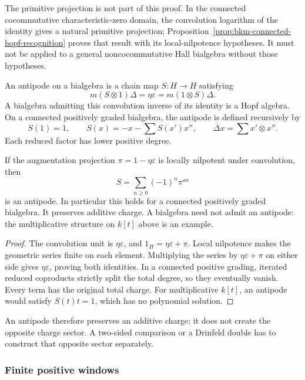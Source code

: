 The primitive projection is not part of this proof. In the
connected cocommutative characteristic-zero domain, the
convolution logarithm of the identity gives a natural primitive
projection; Proposition~\ref{prop:bkm-connected-hopf-recognition}
proves that result with its local-nilpotence hypotheses. It must
not be applied to a general noncocommutative Hall bialgebra
without those hypotheses.

\begin{definition}[Antipode]
\label{def:finite-hall-antipode-datum}
An antipode on a bialgebra is a chain map $S:H\to H$ satisfying
\[
 m(S\otimes1)\Delta=\eta\varepsilon
                 =m(1\otimes S)\Delta.
\]
A bialgebra admitting this convolution inverse of its identity
is a Hopf algebra. On a connected positively graded bialgebra,
the antipode is defined recursively by
\[
 S(1)=1,\qquad S(x)=-x-\sum S(x')x'',
 \qquad\overline\Delta x=\sum x'\otimes x''.
\]
Each reduced factor has lower positive degree.
\end{definition}

\begin{proposition}
\label{prop:finite-hall-nonhopf-boundary}
If the augmentation projection $\pi=1-\eta\varepsilon$ is
locally nilpotent under convolution, then
\[
 S=\sum_{n\geq0}(-1)^n\pi^{\star n}
\]
is an antipode. In particular this holds for a connected
positively graded bialgebra. It preserves additive charge.
A bialgebra need not admit an antipode: the multiplicative
structure on $k[t]$ above is an example.
\end{proposition}

\begin{proof}
The convolution unit is $\eta\varepsilon$, and
$1_H=\eta\varepsilon+\pi$. Local nilpotence makes the
geometric series finite on each element. Multiplying the series
by $\eta\varepsilon+\pi$ on either side gives
$\eta\varepsilon$, proving both identities. In a connected
positive grading, iterated reduced coproducts strictly split
the total degree, so they eventually vanish. Every term has
the original total charge. For multiplicative $k[t]$, an
antipode would satisfy $S(t)t=1$, which has no polynomial
solution.
\end{proof}

An antipode therefore preserves an additive charge; it does not
create the opposite charge sector. A two-sided comparison or a
Drinfeld double has to construct that opposite sector separately.

\subsubsection*{Finite positive windows}

